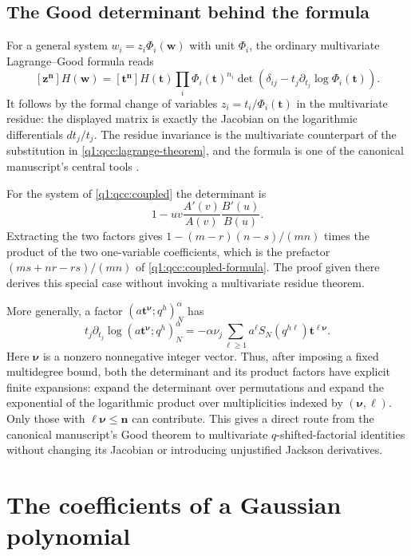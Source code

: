 \documentclass[11pt,a4paper,oneside,openany]{book}
\theoremstyle{definition}
\theoremstyle{remark}
\newcommand{\poch}[3]{(#1;#2)_{#3}}
\begin{document}
\section{The Good determinant behind the formula}
For a general system $w_i=z_i\Phi_i(\bm w)$ with unit $\Phi_i$, the ordinary
multivariate Lagrange--Good formula reads
\begin{equation}\label{q2:eq:Good}
 [\bm z^{\bm n}]H(\bm w)
 =[\bm t^{\bm n}]H(\bm t)\prod_i\Phi_i(\bm t)^{n_i}
   \det\left(\delta_{ij}-t_j\partial_{t_j}\log\Phi_i(\bm t)\right).
\end{equation}
It follows by the formal change of variables $z_i=t_i/\Phi_i(\bm t)$ in the
multivariate residue: the displayed matrix is exactly the Jacobian on the
logarithmic differentials $dt_j/t_j$. The residue invariance is the
multivariate counterpart of the substitution in \cref{q1:qcc:lagrange-theorem}, and the
formula is one of the canonical manuscript's central tools \cite{ccc}.


For the system of \cref{q1:qcc:coupled} the determinant is
\[
 1-uv\frac{A'(v)}{A(v)}\frac{B'(u)}{B(u)}.
\]
Extracting the two factors gives \(1-(m-r)(n-s)/(mn)\) times the product
of the two one-variable coefficients, which is the prefactor
\((ms+nr-rs)/(mn)\) of \eqref{q1:qcc:coupled-formula}. The proof given
there derives this special case without invoking a multivariate residue
theorem.


More generally, a factor
$\poch{a\bm t^{\bm\nu}}{q^h}N^\alpha$ has
\begin{equation}\label{q2:eq:Good-entry}
 t_j\partial_{t_j}\log\poch{a\bm t^{\bm\nu}}{q^h}N^\alpha
  =-\alpha\nu_j\sum_{\ell\ge1}
       a^\ell S_N(q^{h\ell})\bm t^{\ell\bm\nu}.
\end{equation}
Here $\bm\nu$ is a nonzero nonnegative integer vector. Thus, after imposing a
fixed multidegree bound, both the determinant and its product factors have
explicit finite expansions: expand the determinant over permutations and expand
the exponential of the logarithmic product over multiplicities indexed by
$(\bm\nu,\ell)$. Only those with $\ell\bm\nu\le\bm n$ can contribute.
This gives a direct route from the canonical manuscript's Good theorem to multivariate
$q$-shifted-factorial identities without changing its Jacobian or introducing
unjustified Jackson derivatives.
\chapter{The coefficients of a Gaussian polynomial}
\label{q1:qcc:gaussian-coefficients}
\end{document}
